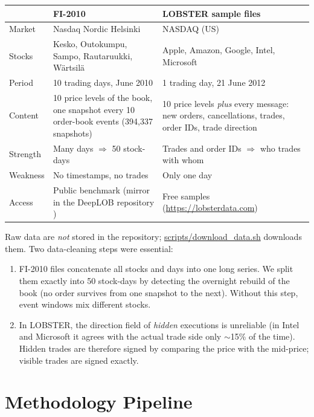 \documentclass[11pt,a4paper]{article}
\begin{document}
\begin{center}
\begin{tabularx}{\linewidth}{@{}l X X@{}}
\toprule
& \textbf{FI-2010} \cite{ntakaris2018} & \textbf{LOBSTER sample files} \cite{lobster} \\
\midrule
Market & Nasdaq Nordic Helsinki & NASDAQ (US) \\
Stocks & Kesko, Outokumpu, Sampo, Rautaruukki, W\"artsil\"a & Apple, Amazon, Google, Intel, Microsoft \\
Period & 10 trading days, June 2010 & 1 trading day, 21 June 2012 \\
Content & 10 price levels of the book, one snapshot every 10 order-book events (394{,}337 snapshots) & 10 price levels \emph{plus} every message: new orders, cancellations, trades, order IDs, trade direction \\
Strength & Many days $\Rightarrow$ 50 stock-days & Trades and order IDs $\Rightarrow$ who trades with whom \\
Weakness & No timestamps, no trades & Only one day \\
Access & Public benchmark (mirror in the DeepLOB repository \cite{deeplob}) & Free samples (\url{https://lobsterdata.com}) \\
\bottomrule
\end{tabularx}
\end{center}

\noindent Raw data are \emph{not} stored in the repository; \href{https://github.com/sharanyabaidya/Market_Micro_Project/blob/main/scripts/download_data.sh}{scripts/download\_data.sh}
downloads them. Two data-cleaning steps were essential:
\begin{enumerate}
  \item FI-2010 files concatenate all stocks and days into one long series. We split them exactly into
        50 stock-days by detecting the overnight rebuild of the book (no order survives from one snapshot to
        the next). Without this step, event windows mix different stocks.
  \item In LOBSTER, the direction field of \emph{hidden} executions is unreliable (in Intel and Microsoft it
        agrees with the actual trade side only $\sim$15\% of the time). Hidden trades are therefore signed by
        comparing the price with the mid-price; visible trades are signed exactly.
\end{enumerate}

\section{Methodology Pipeline}
\label{sec:method}
\end{document}
